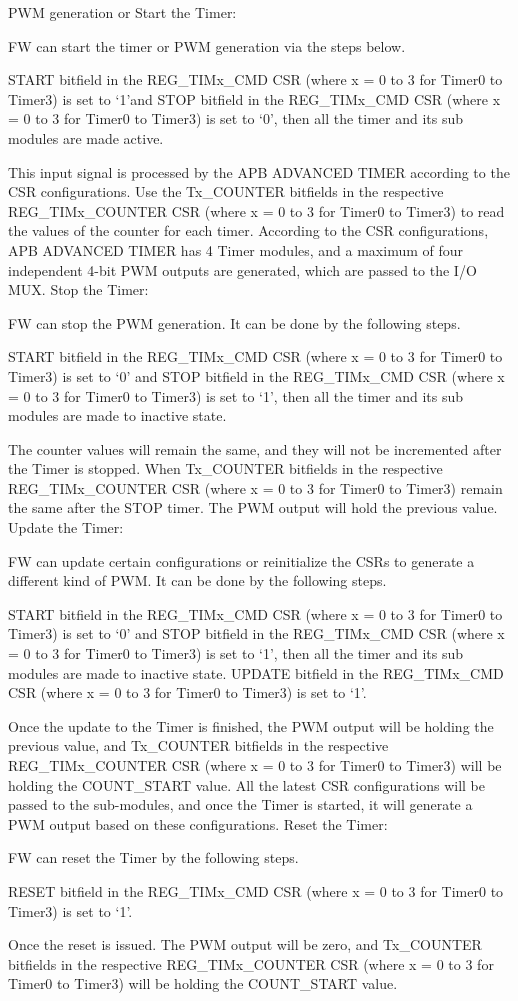 PWM generation or Start the Timer:

FW can start the timer or PWM generation via the steps below.

    START bitfield in the REG_TIMx_CMD CSR (where x = 0 to 3 for Timer0 to Timer3) is set to ‘1’and STOP bitfield in the REG_TIMx_CMD CSR (where x = 0 to 3 for Timer0 to Timer3) is set to ‘0’, then all the timer and its sub modules are made active.

This input signal is processed by the APB ADVANCED TIMER according to the CSR configurations. Use the Tx_COUNTER bitfields in the respective REG_TIMx_COUNTER CSR (where x = 0 to 3 for Timer0 to Timer3) to read the values of the counter for each timer. According to the CSR configurations, APB ADVANCED TIMER has 4 Timer modules, and a maximum of four independent 4-bit PWM outputs are generated, which are passed to the I/O MUX.
Stop the Timer:

FW can stop the PWM generation. It can be done by the following steps.

    START bitfield in the REG_TIMx_CMD CSR (where x = 0 to 3 for Timer0 to Timer3) is set to ‘0’ and STOP bitfield in the REG_TIMx_CMD CSR (where x = 0 to 3 for Timer0 to Timer3) is set to ‘1’, then all the timer and its sub modules are made to inactive state.

The counter values will remain the same, and they will not be incremented after the Timer is stopped. When Tx_COUNTER bitfields in the respective REG_TIMx_COUNTER CSR (where x = 0 to 3 for Timer0 to Timer3) remain the same after the STOP timer. The PWM output will hold the previous value.
Update the Timer:

FW can update certain configurations or reinitialize the CSRs to generate a different kind of PWM. It can be done by the following steps.

    START bitfield in the REG_TIMx_CMD CSR (where x = 0 to 3 for Timer0 to Timer3) is set to ‘0’ and STOP bitfield in the REG_TIMx_CMD CSR (where x = 0 to 3 for Timer0 to Timer3) is set to ‘1’, then all the timer and its sub modules are made to inactive state. UPDATE bitfield in the REG_TIMx_CMD CSR (where x = 0 to 3 for Timer0 to Timer3) is set to ‘1’.

Once the update to the Timer is finished, the PWM output will be holding the previous value, and Tx_COUNTER bitfields in the respective REG_TIMx_COUNTER CSR (where x = 0 to 3 for Timer0 to Timer3) will be holding the COUNT_START value. All the latest CSR configurations will be passed to the sub-modules, and once the Timer is started, it will generate a PWM output based on these configurations.
Reset the Timer:

FW can reset the Timer by the following steps.

    RESET bitfield in the REG_TIMx_CMD CSR (where x = 0 to 3 for Timer0 to Timer3) is set to ‘1’.

Once the reset is issued. The PWM output will be zero, and Tx_COUNTER bitfields in the respective REG_TIMx_COUNTER CSR (where x = 0 to 3 for Timer0 to Timer3) will be holding the COUNT_START value.

